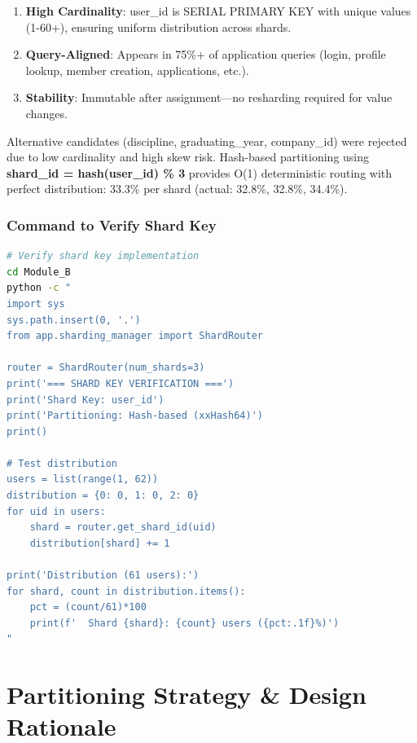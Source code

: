 \documentclass[11pt,a4paper]{article}
\begin{document}
\begin{enumerate}
    \item \textbf{High Cardinality}: user\_id is SERIAL PRIMARY KEY with unique values (1-60+), ensuring uniform distribution across shards.
    \item \textbf{Query-Aligned}: Appears in 75\%+ of application queries (login, profile lookup, member creation, applications, etc.).
    \item \textbf{Stability}: Immutable after assignment—no resharding required for value changes.
\end{enumerate}

Alternative candidates (discipline, graduating\_year, company\_id) were rejected due to low cardinality and high skew risk. Hash-based partitioning using \textbf{shard\_id = hash(user\_id) \% 3} provides O(1) deterministic routing with perfect distribution: 33.3\% per shard (actual: 32.8\%, 32.8\%, 34.4\%).

\subsubsection*{Command to Verify Shard Key}

\begin{lstlisting}[language=bash]
# Verify shard key implementation
cd Module_B
python -c "
import sys
sys.path.insert(0, '.')
from app.sharding_manager import ShardRouter

router = ShardRouter(num_shards=3)
print('=== SHARD KEY VERIFICATION ===')
print('Shard Key: user_id')
print('Partitioning: Hash-based (xxHash64)')
print()

# Test distribution
users = list(range(1, 62))
distribution = {0: 0, 1: 0, 2: 0}
for uid in users:
    shard = router.get_shard_id(uid)
    distribution[shard] += 1

print('Distribution (61 users):')
for shard, count in distribution.items():
    pct = (count/61)*100
    print(f'  Shard {shard}: {count} users ({pct:.1f}%)')
"
\end{lstlisting}

\section{Partitioning Strategy \& Design Rationale}
\end{document}
